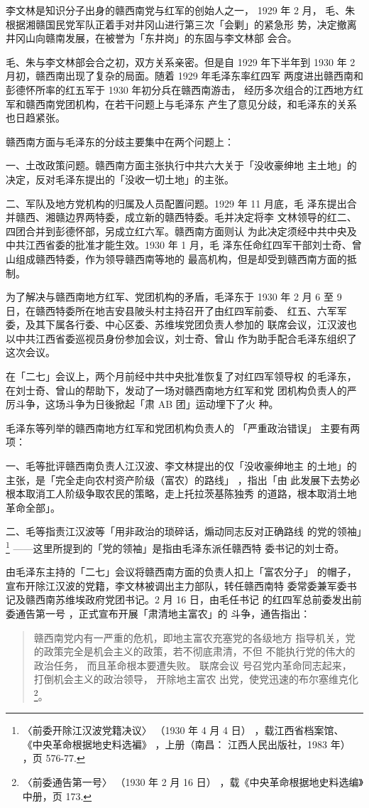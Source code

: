李文林是知识分子出身的赣西南党与红军的创始人之一，
1929 年 2 月，
毛、朱根据湘赣国民党军队正着手对井冈山进行第三次「会剿」的紧急形
势，决定撤离井冈山向赣南发展，在被誉为「东井岗」的东固与李文林部
会合。
 
毛、朱与李文林部会合之初，双方关系亲密。但是自 1929 年下半年到
1930 年 2 月初，赣西南出现了复杂的局面。随着 1929 年毛泽东率红四军
两度进出赣西南和彭德怀所率的红五军于 1930 年初分兵在赣西南游击，
经历多次组合的江西地方红军和赣西南党团机构，在若干问题上与毛泽东
产生了意见分歧，和毛泽东的关系也日趋紧张。
 
赣西南方面与毛泽东的分歧主要集中在两个问题上：
 
一、土改政策问题。赣西南方面主张执行中共六大关于「没收豪绅地
主土地」的决定，反对毛泽东提出的「没收一切土地」的主张。
 
二、军队及地方党机构的归属及人员配置问题。1929 年 11 月底，毛
泽东提出合并赣西、湘赣边界两特委，成立新的赣西特委。毛并决定将李
文林领导的红二、四团合并到彭德怀部，另成立红六军。赣西南方面则认
为此决定须经中共中央及中共江西省委的批准才能生效。1930 年 1 月，毛
泽东任命红四军干部刘士奇、曾山组成赣西特委，作为领导赣西南等地的
最高机构，但是却受到赣西南方面的抵制。

为了解决与赣西南地方红军、党团机构的矛盾，毛泽东于 1930 年 2
月 6 至 9 日，在赣西特委所在地吉安县陂头村主持召开了由红四军前委、
红五、六军军委，及其下属各行委、中心区委、苏维埃党团负责人参加的
联席会议，江汉波也以中共江西省委巡视员身份参加会议，刘士奇、曾山
作为助手配合毛泽东组织了这次会议。

在「二七」会议上，两个月前经中共中央批准恢复了对红四军领导权
的毛泽东，在刘士奇、曾山的帮助下，发动了一场对赣西南地方红军和党
团机构负责人的严厉斗争，这场斗争为日後掀起「肃 AB 团」运动埋下了火
种。

毛泽东等列举的赣西南地方红军和党团机构负责人的
「严重政治错误」
主要有两项：

一、毛等批评赣西南负责人江汉波、李文林提出的仅「没收豪绅地主
的土地」的主张，是「完全走向农村资产阶级（富农）的路线」
，指出「由
此发展下去势必根本取消工人阶级争取农民的策略，走上托拉茨基陈独秀
的道路，根本取消土地革命全部」。


二、毛等指责江汉波等「用非政治的琐碎话，煽动同志反对正确路线
的党的领袖」\footnote{ 〈前委开除江汉波党籍决议〉
（1930 年 4 月 4 日）
，载江西省档案馆、
《中央革命根据地史料选褊》
，上册（南昌：
江西人民出版社，1983 年）
，页 576-77.} ——这里所提到的「党的领袖」是指由毛泽东派任赣西特
委书记的刘士奇。

由毛泽东主持的「二七」会议将赣西南方面的负责人扣上「富农分子」
的帽子，宣布开除江汉波的党籍，李文林被调出主力部队，转任赣西南特
委常委兼军委书记及赣西南苏维埃政府党团书记。2 月 16 日，由毛任书记
的红四军总前委发出前委通告第一号
，正式宣布开展「肃清地主富农」的
斗争，通告指出：
\begin{quote}
	\fzwkai 赣西南党内有一严重的危机，即地主富农充塞党的各级地方
指导机关，党的政策完全是机会主义的政策，若不彻底肃清，不但
不能执行党的伟大的政治任务，
而且革命根本要遭失败。
联席会议
号召党内革命同志起来，
打倒机会主义的政治领导，
开除地主富农
出党，使党迅速的布尔塞维克化
\footnote{ 〈前委通告第一号〉
（1930 年 2 月 16 日）
，载《中央革命根据地史料选编》中册，页 173.}。
\end{quote}

